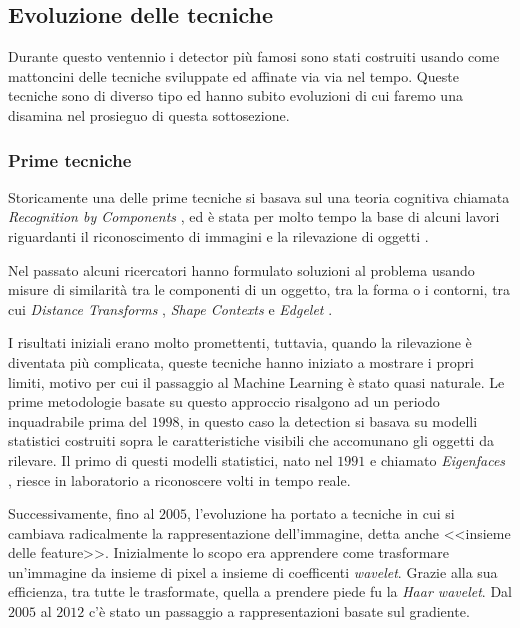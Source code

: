 \subsection{Evoluzione delle tecniche}
Durante questo ventennio i detector più famosi sono stati costruiti usando come mattoncini delle tecniche sviluppate ed affinate via via nel tempo. Queste tecniche sono di diverso tipo ed hanno subito evoluzioni di cui faremo una disamina nel prosieguo di questa sottosezione.
\subsubsection{Prime tecniche}
Storicamente una delle prime tecniche si basava sul una teoria cognitiva chiamata \textit{Recognition by Components} \cite{biederman1987recognition}, ed è stata per molto tempo la base di alcuni lavori riguardanti il riconoscimento di immagini e la rilevazione di oggetti \cite{felzenszwalb2008discriminatively, fischler1973representation, leibe2008robust}.   

Nel passato alcuni ricercatori hanno formulato soluzioni al problema usando misure di similarità tra le componenti di un oggetto, tra la forma o i contorni, tra cui \textit{Distance Transforms} \cite{gavrila1999real}, \textit{Shape Contexts} \cite{belongie2002shape} e \textit{Edgelet} \cite{wu2005detection}.

I risultati iniziali erano molto promettenti, tuttavia, quando la rilevazione è diventata più complicata, queste tecniche hanno iniziato a mostrare i propri limiti, motivo per cui il passaggio al Machine Learning è stato quasi naturale. Le prime metodologie basate su questo approccio risalgono ad un periodo inquadrabile prima del $1998$, in questo caso la detection si basava su modelli statistici costruiti sopra le caratteristiche visibili che accomunano gli oggetti da rilevare. 
Il primo di questi modelli statistici, nato nel $1991$ e chiamato \textit{Eigenfaces} \cite{turk1991eigenfaces, pentland1994view}, riesce in laboratorio a riconoscere volti in tempo reale.

Successivamente, fino al $2005$, l'evoluzione ha portato a tecniche in cui si cambiava radicalmente la rappresentazione dell'immagine, detta anche <<insieme delle feature>>. Inizialmente lo scopo era apprendere come trasformare un'immagine da insieme di pixel a insieme di coefficenti \textit{wavelet}. Grazie alla sua efficienza, tra tutte le trasformate, quella a prendere piede fu la \textit{Haar wavelet}. Dal $2005$ al $2012$ c'è stato un passaggio a rappresentazioni basate sul gradiente. 

